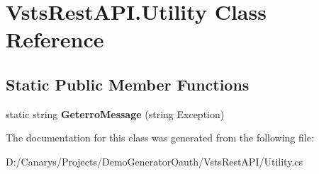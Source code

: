 \hypertarget{class_vsts_rest_a_p_i_1_1_utility}{}\section{Vsts\+Rest\+A\+P\+I.\+Utility Class Reference}
\label{class_vsts_rest_a_p_i_1_1_utility}
\subsection*{Static Public Member Functions}
\begin{DoxyCompactItemize}
\item 
\mbox{\label{class_vsts_rest_a_p_i_1_1_utility_ac76d3eef465a4c5708878000c2160394}} 
static string {\bfseries Geterro\+Message} (string Exception)
\end{DoxyCompactItemize}


The documentation for this class was generated from the following file\+:\begin{DoxyCompactItemize}
\item 
D\+:/\+Canarys/\+Projects/\+Demo\+Generator\+Oauth/\+Vsts\+Rest\+A\+P\+I/Utility.\+cs\end{DoxyCompactItemize}
